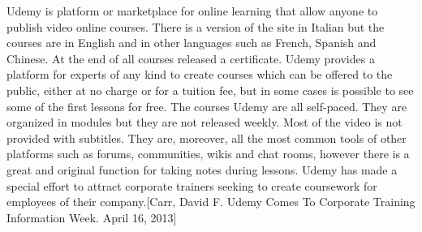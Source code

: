 Udemy is platform  or marketplace for online learning that allow anyone to publish video online courses. There is a version of the site in Italian but the courses are in English and in other languages such as French, Spanish and Chinese. At the end of all courses released a certificate. Udemy provides a platform for experts of any kind to create courses which can be offered to the public, either at no charge or for a tuition fee, but in some cases is possible to see some of the first lessons for free.
The courses Udemy are all self-paced. They are organized in modules but they are not released weekly. Most of the video is not provided with subtitles. They are, moreover, all the most common tools of other platforms such as forums, communities, wikis and chat rooms, however there is a great and original function for taking notes during lessons.
Udemy has made a special effort to attract corporate trainers seeking to create coursework for employees of their company.[Carr, David F. Udemy Comes To Corporate Training Information Week. April 16, 2013]
